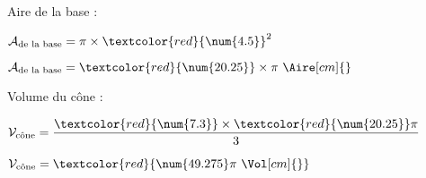 \begin{corrige}
\begin{enumerate}
        Aire de la base : 

        \medskip            
        $\mathcal{A}_{\text{de la base}} = \pi\times \textcolor{red}{\num{4.5}}^2$

        \medskip
        $\mathcal{A}_{\text{de la base}} = \textcolor{red}{\num{20.25}}\times\pi{}~\Aire[cm]{}$

        \bigskip
        Volume du cône :

        \medskip
        $\mathcal{V}_{\text{cône}} = \dfrac{\textcolor{red}{\num{7.3}}\times \textcolor{red}{\num{20.25}}\pi}{3}$

        \medskip
        $\mathcal{V}_{\text{cône}} = \textcolor{red}{\num{49.275}\pi~\Vol[cm]{}}$
    \end{enumerate}
\end{corrige}

